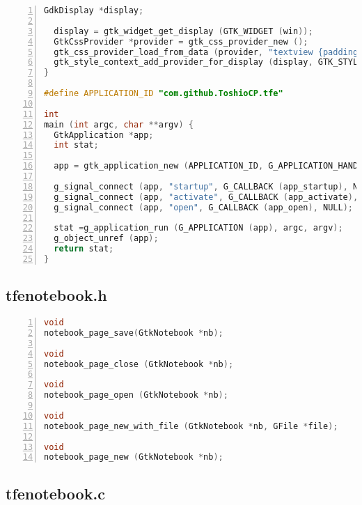 \begin{lstlisting}[language=C, numbers=left]
GdkDisplay *display;

  display = gtk_widget_get_display (GTK_WIDGET (win));
  GtkCssProvider *provider = gtk_css_provider_new ();
  gtk_css_provider_load_from_data (provider, "textview {padding: 10px; font-family: monospace; font-size: 12pt;}", -1);
  gtk_style_context_add_provider_for_display (display, GTK_STYLE_PROVIDER (provider), GTK_STYLE_PROVIDER_PRIORITY_APPLICATION);
}

#define APPLICATION_ID "com.github.ToshioCP.tfe"

int
main (int argc, char **argv) {
  GtkApplication *app;
  int stat;

  app = gtk_application_new (APPLICATION_ID, G_APPLICATION_HANDLES_OPEN);

  g_signal_connect (app, "startup", G_CALLBACK (app_startup), NULL);
  g_signal_connect (app, "activate", G_CALLBACK (app_activate), NULL);
  g_signal_connect (app, "open", G_CALLBACK (app_open), NULL);

  stat =g_application_run (G_APPLICATION (app), argc, argv);
  g_object_unref (app);
  return stat;
}
\end{lstlisting}

\hypertarget{tfenotebook.h}{%
\subsection{tfenotebook.h}\label{tfenotebook.h}}

\begin{lstlisting}[language=C, numbers=left]
void
notebook_page_save(GtkNotebook *nb);

void
notebook_page_close (GtkNotebook *nb);

void
notebook_page_open (GtkNotebook *nb);

void
notebook_page_new_with_file (GtkNotebook *nb, GFile *file);

void
notebook_page_new (GtkNotebook *nb);
\end{lstlisting}

\hypertarget{tfenotebook.c}{%
\subsection{tfenotebook.c}\label{tfenotebook.c}}

